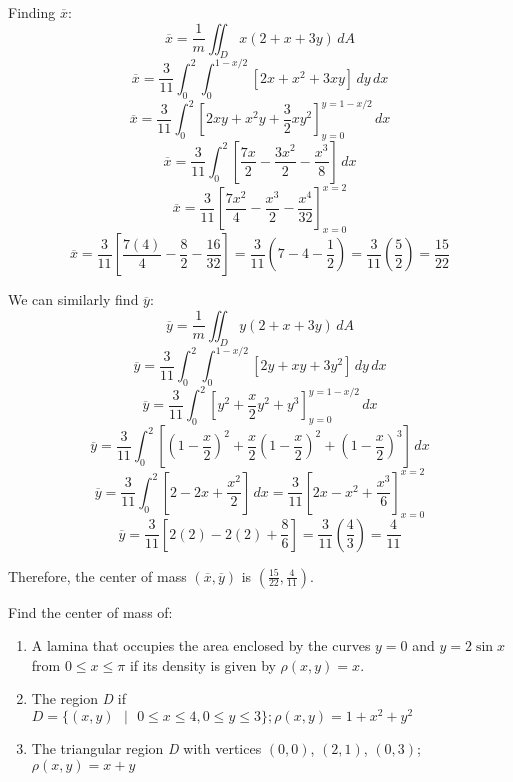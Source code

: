 Finding $\overline{x}$:
$$\overline{x} = \frac{1}{m} \iint_{\textit{D}} x \left( 2 + x + 3y \right) 
\,dA$$
$$\overline{x} = \frac{3}{11} \int_0^2 \int_0^{1 - x/2} \left[ 2x + x^2 + 3xy 
\right] \,dy \,dx$$
$$\overline{x} = \frac{3}{11} \int_0^2 \left[ 2xy + x^2y + \frac{3}{2}xy^2 
\right]_{y = 0}^{y = 1 - x/2} \,dx$$
$$\overline{x} = \frac{3}{11} \int_0^2 \left[ \frac{7x}{2} - \frac{3x^2}{2} - 
\frac{x^3}{8} \right]\,dx$$
$$\overline{x} = \frac{3}{11} \left[ \frac{7x^2}{4} - \frac{x^3}{2} - \frac{x
^4}{32} \right]_{x = 0}^{x = 2}$$
$$\overline{x} = \frac{3}{11} \left[ \frac{7(4)}{4} - \frac{8}{2} - \frac{16}{
32} \right] = \frac{3}{11} \left( 7 - 4 - \frac{1}{2} \right) = \frac{3}{11} 
\left( \frac{5}{2} \right) = \frac{15}{22}$$

We can similarly find $\overline{y}$:
$$\overline{y} = \frac{1}{m} \iint_{\textit{D}} y \left(2 + x + 3y \right)
\,dA$$
$$\overline{y} = \frac{3}{11} \int_0^2 \int_0^{1 - x/2} \left[ 2y + xy + 3y^2 
\right]\,dy\,dx$$
$$\overline{y} = \frac{3}{11} \int_0^2 \left[ y^2 + \frac{x}{2}y^2 + y^3 
\right]_{y = 0}^{y = 1 - x/2} \,dx$$
$$\overline{y} = \frac{3}{11} \int_0^2 \left[ \left(1 - \frac{x}{2} \right)^2 
+ \frac{x}{2} \left( 1 - \frac{x}{2} \right)^2 + \left( 1 - \frac{x}{2} \right)
^3 \right] \,dx$$
$$\overline{y} = \frac{3}{11} \int_0^2 \left[ 2 - 2x + \frac{x^2}{2} \right]
\,dx = \frac{3}{11} \left[ 2x - x^2 + \frac{x^3}{6} \right]_{x = 0}^{x = 2}$$
$$\overline{y} = \frac{3}{11} \left[ 2(2) - 2(2) + \frac{8}{6} \right] = \frac{
3}{11} \left( \frac{4}{3} \right) = \frac{4}{11}$$

Therefore, the center of mass $(\overline{x}, \overline{y})$ is $(\frac{15}{22
}, \frac{4}{11})$.

\begin{Exercise}[title = {Center of Mass}, label = c_of_m]
Find the center of mass of: 
\begin{enumerate}
\item A lamina that occupies the area enclosed by the 
curves $y = 0$ and $y = 2\sin{x}$ from $0 \leq x \leq \pi$ if its density is 
given by $\rho (x,y) = x$.
\item The region \textit{D} if $\textit{D} = \{(x, y)\text{ }|\text{ } 0 \leq x
\leq 4, 0 \leq y \leq 3 \}; \rho (x, y) = 1 + x^2 + y^2$
\item The triangular region \textit{D} with vertices $(0, 0)$, $(2, 1)$, 
$(0, 3)$; $\rho (x, y) = x + y$
\end{enumerate}
\vspace{100mm}
\end{Exercise}

